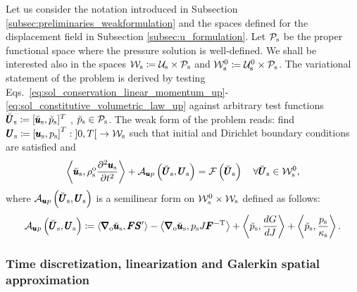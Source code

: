 \documentclass[11pt,english]{article}
\def\usolid{\pmb{u}_{\rm{s}}}                   %
\def\psolid{p_{\rm{s}}}                         %
\def\devPK{\pmb{S}^\prime}                      %
\def\unknosolid{\pmb{U}_{\rm{s}}}               %
\def\usolidspace{\mathcal{U}_{\rm{s}}}          %
\def\psolidspace{\mathcal{P}_{\rm{s}}}          %
\def\unknosolidspace{\mathcal{W}_{\rm{s}}}      %
\def\testusolid{\breve{\pmb{u}}_{\rm{s}}}       %
\def\testpsolid{\breve{p}_{\rm{s}}}             %
\def\testsolid{\breve{\pmb{U}}_{\rm{s}}}        %
\def\testusolidspace{\mathcal{U}_{\rm{s}}^0}    %
\def\testsolidspace{\mathcal{W}_{\rm{s}}^0}     %
\def\F{\pmb{F}}                             %
\def\invFtrans{\pmb{F}^{-\rm{T}}}           %
\def\dGdJ{\frac{dG}{dJ}}                    %
\def\grad{\pmb{\nabla}_{\rm{o}}}        %
\def\denssolid{\rho_{\rm{s}}^{\rm{o}}}  %
\def\kappasolid{\kappa_{\rm{s}}}        %
\def\up{\pmb{u} p}
\def\timeint{\left ] 0,T\right[}                         %
\def\dudt{\frac{\partial \usolid}{\partial t}}          %
\def\dudt2{\frac{\partial^2 \usolid}{\partial t^2}}     %
\begin{document}
Let us consider the notation introduced in Subsection \ref{subsec:preliminaries_weakformulation} and the spaces defined for the displacement field in Subsection \ref{subsec:u_formulation}. Let $\psolidspace$ be the proper functional space where the pressure solution is well-defined. We shall be interested also in the spaces $\unknosolidspace \coloneqq \usolidspace \times \psolidspace$ and $\testsolidspace \coloneqq \testusolidspace \times \psolidspace$. The variational statement of the problem is derived by testing Eqs.~\eqref{eq:sol_conservation_linear_momentum_up}-\eqref{eq:sol_constitutive_volumetric_law_up} against arbitrary test functions $\testsolid \coloneqq [\testusolid,\testpsolid]^T$ , $\testpsolid \in \psolidspace$. The weak form of the problem reads: find $\unknosolid \coloneqq \left [ \usolid, \psolid \right ]^T : \timeint \rightarrow  \unknosolidspace $ such that initial and Dirichlet boundary conditions are satisfied and
\begin{equation*}
     \left \langle \testusolid, \denssolid \dudt2 \right \rangle + \mathcal{A}_{\up} \left ( \testsolid, \unknosolid \right) = \mathcal{F} \left ( \testsolid  \right) \quad \forall \testsolid \in \testsolidspace,
\end{equation*}
where $\mathcal{A}_{\up} \left ( \testsolid, \unknosolid \right)$ is a semilinear form on $\testsolidspace \times \unknosolidspace $ defined as follows:
\begin{alignat*}{1}
    \mathcal{A}_{\up} \left ( \testsolid, \unknosolid \right)  
    \coloneqq \left \langle \grad \testusolid,  \F \devPK \right \rangle  
    - \left \langle \grad \testusolid ,  \psolid J \invFtrans \right \rangle 
    + \left \langle \testpsolid , \dGdJ \right \rangle 
    + \left \langle \testpsolid , \frac{\psolid}{\kappasolid} \right \rangle.
\end{alignat*}

\subsubsection{Time discretization, linearization and Galerkin spatial approximation\label{subsubsec:up_formulation_time_space_linearization}}
\end{document}

